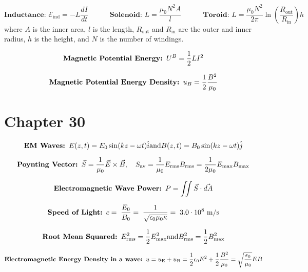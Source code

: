 \documentclass[fleqn,12pt]{article}
\begin{document}
\begin{equation} \label{eq1}
 \textbf{Inductance: }\mathcal{E}_\mathrm{ind} = -L \frac{dI}{dt}
 \quad \quad \quad \textbf{Solenoid: }L = \frac{\mu_0 N^2 A}{l}
 \quad \quad \quad \textbf{Toroid: }L = \frac{\mu_0 N^2}{2\pi}\ln \left( \frac{R_\mathrm{out}}{R_\mathrm{in}} \right)h
\end{equation}
where $A$ is the inner area, $l$ is the length, $R_\mathrm{out}$ and $R_\mathrm{in}$ are the outer and inner radius, $h$ is the height, and $N$ is the number of windings.

\begin{equation}
    \label{eq2}
   \mbox{\textbf{Magnetic Potential Energy: }} U^B = \frac{1}{2}LI^2
\end{equation}

\begin{equation}
    \label{eq3}
    \mbox{\textbf{Magnetic Potential Energy Density: }}u_B = \frac{1}{2}\frac{B^2}{\mu_0}
\end{equation}

\section*{Chapter 30}

\begin{equation}
    \label{eq3}
    \mbox{\textbf{EM Waves: }}
    {E}(z,t) = {E_0}\sin(kz - \omega t)\hat{i} \\ \mbox{and} \\ {B}(z,t) = {B_0}\sin(kz - \omega t)\hat{j}
\end{equation}


\begin{equation}
    \label{eq3}
    \mbox{\textbf{Poynting Vector: }}
    \vec{S} = \frac{1}{\mu_0}\vec{E} \times \vec{B},\quad S_\mathrm{av} = \frac{1}{\mu_0}E_\mathrm{rms}B_\mathrm{rms} = \frac{1}{2\mu_0}E_\mathrm{max}B_\mathrm{max}
\end{equation}

\begin{equation}
    \label{eq3}
    \mbox{\textbf{Electromagnetic Wave Power: }}
    P = \iint \vec{S} \cdot \vec{dA}
\end{equation}

\begin{equation}
    \label{eq3}
    \mbox{\textbf{Speed of Light: }}
    c = \; \frac{E_0}{B_0} = \; \frac{1}{\sqrt{\epsilon_0\mu_0\kappa}}  = \; 3.0 \cdot 10^8 \  \si{\meter\per\second}
\end{equation}

\begin{equation}
    \label{eq3}
    \mbox{\textbf{Root Mean Squared: }}
    E_\mathrm{rms}^{2} = \frac{1}{2}E_\mathrm{max}^2 \\ \mbox{and} \\ B_\mathrm{rms}^{2} = \frac{1}{2}B_\mathrm{max}^2
\end{equation}

\begin{equation}
    \label{eq3}
    \mbox{\textbf{Electromagnetic Energy Density in a wave: }}
    u = u_\mathrm{E} + u_\mathrm{B} = \frac{1}{2}\epsilon_0E^2 + \frac{1}{2}\frac{B^2}{\mu_0} = \sqrt{\frac{\epsilon_0}{\mu_0}}E B
\end{equation}
\end{document}
